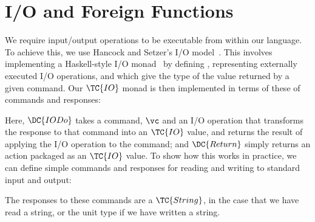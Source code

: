 \section{I/O and Foreign Functions}

\label{ioforeign}

\newcommand{\IO}{\TC{IO}}
\newcommand{\IODo}{\DC{IODo}}
\newcommand{\IOReturn}{\DC{Return}}

We require input/output operations to be executable from within our
language. To achieve this, we use Hancock and Setzer's I/O
model~\cite{hancock-interactive}. This involves implementing a
Haskell-style I/O monad~\cite{HaskellIO} by defining ,
representing externally executed I/O operations, and 
which give the type of the value returned by a given command. Our
$\IO$ monad is then implemented in terms of these of commands and
responses:


\noindent
Here, $\IODo$ takes a command, $\vc$ and an I/O operation that transforms the response to that command into an $\IO$ value, 
and returns the result of applying the I/O operation to the command; and $\IOReturn$ simply returns an action packaged as an $\IO$ value.
To show how this works in practice, we can define simple commands and
responses for reading and writing to standard input and output:


\noindent
The responses to these commands are a $\TC{String}$, in the case that
we have read a string, or the unit type if we have written a string.


